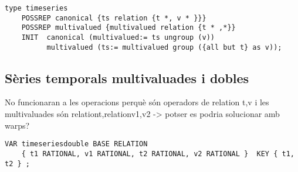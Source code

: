\begin{verbatim}
type timeseries
	POSSREP canonical {ts relation {t *, v * }}}
	POSSREP multivalued {multivalued relation {t * ,*}} 
	INIT  canonical (multivalued:= ts ungroup (v))
	      multivalued (ts:= multivalued group ({all but t} as v));
\end{verbatim}






\subsection{Sèries temporals multivaluades i dobles}


\todo{}

No funcionaran a les operacions perquè són operadors de relation {t,v} i les multivaluades són relation{t,relation{v1,v2}} -> potser es podria solucionar amb warps?


\begin{verbatim}
VAR timeseriesdouble BASE RELATION
    { t1 RATIONAL, v1 RATIONAL, t2 RATIONAL, v2 RATIONAL }  KEY { t1, t2 } ;
\end{verbatim}










